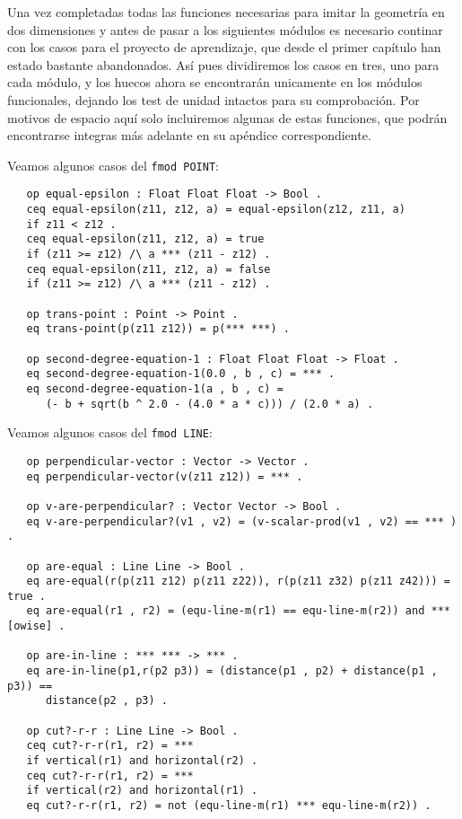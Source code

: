 
Una vez completadas todas las funciones necesarias para imitar la geometría en dos dimensiones y antes de pasar a los siguientes módulos es necesario continar con los casos para el proyecto de aprendizaje, que desde el primer capítulo  han estado bastante abandonados. Así pues dividiremos los casos en tres, uno para cada módulo, y los huecos ahora se encontrarán unicamente en los módulos funcionales, dejando los test de unidad intactos para su comprobación. Por motivos de espacio aquí solo incluiremos algunas de estas funciones, que podrán encontrarse integras más adelante en su apéndice correspondiente.\par

Veamos algunos casos del \texttt{fmod POINT}: \par

{\codesize
\begin{verbatim}
   op equal-epsilon : Float Float Float -> Bool .
   ceq equal-epsilon(z11, z12, a) = equal-epsilon(z12, z11, a)
   if z11 < z12 .
   ceq equal-epsilon(z11, z12, a) = true
   if (z11 >= z12) /\ a *** (z11 - z12) .
   ceq equal-epsilon(z11, z12, a) = false
   if (z11 >= z12) /\ a *** (z11 - z12) .

   op trans-point : Point -> Point .
   eq trans-point(p(z11 z12)) = p(*** ***) .

   op second-degree-equation-1 : Float Float Float -> Float .
   eq second-degree-equation-1(0.0 , b , c) = *** .
   eq second-degree-equation-1(a , b , c) = 
      (- b + sqrt(b ^ 2.0 - (4.0 * a * c))) / (2.0 * a) . 
\end{verbatim}
}

Veamos algunos casos del \texttt{fmod LINE}: \par

{\codesize
\begin{verbatim}
   op perpendicular-vector : Vector -> Vector .
   eq perpendicular-vector(v(z11 z12)) = *** .

   op v-are-perpendicular? : Vector Vector -> Bool .
   eq v-are-perpendicular?(v1 , v2) = (v-scalar-prod(v1 , v2) == *** ) .

   op are-equal : Line Line -> Bool .
   eq are-equal(r(p(z11 z12) p(z11 z22)), r(p(z11 z32) p(z11 z42))) = true . 
   eq are-equal(r1 , r2) = (equ-line-m(r1) == equ-line-m(r2)) and *** [owise] .

   op are-in-line : *** *** -> *** .
   eq are-in-line(p1,r(p2 p3)) = (distance(p1 , p2) + distance(p1 , p3)) ==
      distance(p2 , p3) . 
	
   op cut?-r-r : Line Line -> Bool .
   ceq cut?-r-r(r1, r2) = *** 
   if vertical(r1) and horizontal(r2) .
   ceq cut?-r-r(r1, r2) = *** 
   if vertical(r2) and horizontal(r1) .
   eq cut?-r-r(r1, r2) = not (equ-line-m(r1) *** equ-line-m(r2)) .
\end{verbatim}
}

